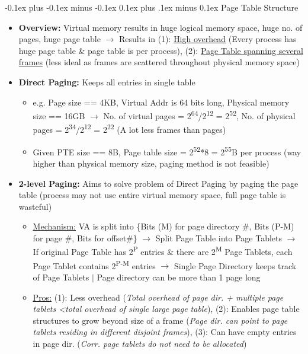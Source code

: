 \documentclass[landscape]{article}
\makeatletter
\renewcommand{\subsection}{\@startsection{subsection}{2}{0mm}%
  {-0.1ex plus -0.1ex minus -0.1ex}%
  {0.1ex plus .1ex minus 0.1ex}%
{\normalfont\scriptsize\bfseries}}
\makeatother
\begin{document}
\begin{multicols*}{6}
    \subsection{Page Table Structure}
    \begin{itemize}
      \item \textbf{Overview:} Virtual memory results in huge logical memory space, huge no. of pages, huge page table $\rightarrow$ Results in (1): \underline{High overhead} (Every process has huge page table \& page table is per process), (2): \underline{Page Table spanning several frames} (less ideal as frames are scattered throughout physical memory space)
      \item \textbf{Direct Paging:} Keeps all entries in single table
      \begin{itemize}
        \item e.g. Page size == 4KB, Virtual Addr is 64 bits long, Physical memory size == 16GB $\rightarrow$ No. of virtual pages = 2\textsuperscript{64}/2\textsuperscript{12} = 2\textsuperscript{52}, No. of physical pages = 2\textsuperscript{34}/2\textsuperscript{12} = 2\textsuperscript{22} (A lot less frames than pages)
        \item Given PTE size == 8B, Page table size = 2\textsuperscript{52}*8 = 2\textsuperscript{55}B per process (way higher than physical memory size, paging method is not feasible)
      \end{itemize}
      \item \textbf{2-level Paging:} Aims to solve problem of Direct Paging by paging the page table (process may not use entire virtual memory space, full page table is wasteful)
      \begin{itemize}
        \item \underline{Mechanism:} VA is split into \{Bits (M) for page directory \#, Bits (P-M) for page \#, Bits for offset\#\} $\rightarrow$ Split Page Table into Page Tablets $\rightarrow$ If original Page Table has 2\textsuperscript{P} entries \& there are 2\textsuperscript{M} Page Tablets, each Page Tablet contains 2\textsuperscript{P-M} entries $\rightarrow$ Single Page Directory keeps track of Page Tablets $\vert$ Page directory can be more than 1 page long
        \item \underline{Pros:} (1): Less overhead (\textit{Total overhead of page dir. + multiple page tablets \textless total overhead of single large page table}), (2): Enables page table structures to grow beyond size of a frame (\textit{Page dir. can point to page tablets residing in different disjoint frames}), (3): Can have empty entries in page dir. (\textit{Corr. page tablets do not need to be allocated})

\end{itemize}
\end{itemize}
\end{multicols*}
\end{document}
